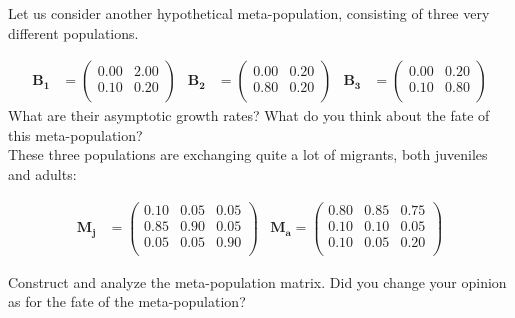 \documentclass{article}\usepackage[]{graphicx}\usepackage[]{color}
\begin{document}
Let us consider another hypothetical meta-population, consisting of three very different populations. 




\begin{align*}\boldsymbol{B_1} &=%
\begin{pmatrix}{}
  0.00 & 2.00 \\ 
  0.10 & 0.20 \\ 
  \end{pmatrix}
& \boldsymbol{B_2} &=%
\begin{pmatrix}{}
  0.00 & 0.20 \\ 
  0.80 & 0.20 \\ 
  \end{pmatrix}
& \boldsymbol{B_3} &=%
\begin{pmatrix}{}
  0.00 & 0.20 \\ 
  0.10 & 0.80 \\ 
  \end{pmatrix}
\end{align*}
What are their asymptotic growth rates? What do you think about the fate of this meta-population?\\

These three populations are exchanging quite a lot of migrants, both juveniles and adults:

\begin{align*}\boldsymbol{M_j} &=%
\begin{pmatrix}{}
  0.10 & 0.05 & 0.05 \\ 
  0.85 & 0.90 & 0.05 \\ 
  0.05 & 0.05 & 0.90 \\ 
  \end{pmatrix}
& \boldsymbol{M_a} =%
\begin{pmatrix}{}
  0.80 & 0.85 & 0.75 \\ 
  0.10 & 0.10 & 0.05 \\ 
  0.10 & 0.05 & 0.20 \\ 
  \end{pmatrix}
\end{align*}

Construct and analyze the meta-population matrix. Did you change your opinion as for the fate of the meta-population?\\
\end{document}
